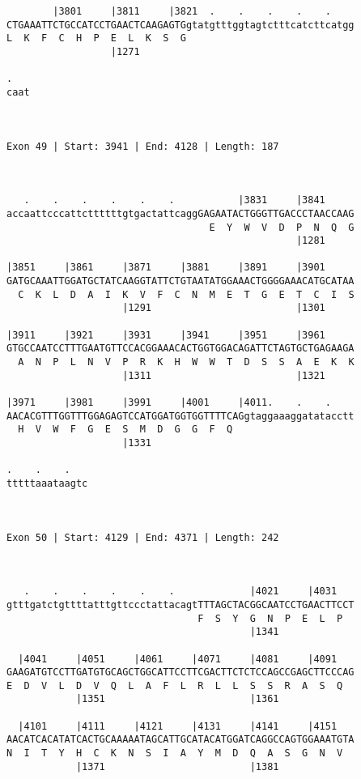 \documentclass{article}
\begin{document}
\begin{Verbatim}
        |3801     |3811     |3821  .    .    .    .    .    
CTGAAATTCTGCCATCCTGAACTCAAGAGTGgtatgtttggtagtctttcatcttcatgg
L  K  F  C  H  P  E  L  K  S  G                             
                  |1271                                     
  
.   
caat
    
    
 
Exon 49 | Start: 3941 | End: 4128 | Length: 187



   .    .    .    .    .    .           |3831     |3841     
accaattcccattcttttttgtgactattcaggGAGAATACTGGGTTGACCCTAACCAAG
                                   E  Y  W  V  D  P  N  Q  G
                                                  |1281     
  
|3851     |3861     |3871     |3881     |3891     |3901     
GATGCAAATTGGATGCTATCAAGGTATTCTGTAATATGGAAACTGGGGAAACATGCATAA
  C  K  L  D  A  I  K  V  F  C  N  M  E  T  G  E  T  C  I  S
                    |1291                         |1301     
  
|3911     |3921     |3931     |3941     |3951     |3961     
GTGCCAATCCTTTGAATGTTCCACGGAAACACTGGTGGACAGATTCTAGTGCTGAGAAGA
  A  N  P  L  N  V  P  R  K  H  W  W  T  D  S  S  A  E  K  K
                    |1311                         |1321     
  
|3971     |3981     |3991     |4001     |4011.    .    .    
AACACGTTTGGTTTGGAGAGTCCATGGATGGTGGTTTTCAGgtaggaaaggatatacctt
  H  V  W  F  G  E  S  M  D  G  G  F  Q                     
                    |1331                                   
  
.    .    .   
tttttaaataagtc
              
              
 
Exon 50 | Start: 4129 | End: 4371 | Length: 242



   .    .    .    .    .    .             |4021     |4031   
gtttgatctgttttatttgttccctattacagtTTTAGCTACGGCAATCCTGAACTTCCT
                                 F  S  Y  G  N  P  E  L  P  
                                          |1341             
  
  |4041     |4051     |4061     |4071     |4081     |4091   
GAAGATGTCCTTGATGTGCAGCTGGCATTCCTTCGACTTCTCTCCAGCCGAGCTTCCCAG
E  D  V  L  D  V  Q  L  A  F  L  R  L  L  S  S  R  A  S  Q  
            |1351                         |1361             
  
  |4101     |4111     |4121     |4131     |4141     |4151   
AACATCACATATCACTGCAAAAATAGCATTGCATACATGGATCAGGCCAGTGGAAATGTA
N  I  T  Y  H  C  K  N  S  I  A  Y  M  D  Q  A  S  G  N  V  
            |1371                         |1381             
  

\end{Verbatim}
\end{document}
